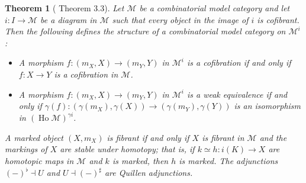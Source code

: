 \documentclass[a4paper]{article}
\newtheorem{theorem}{Theorem}
\theoremstyle{remark}
\theoremstyle{definition}
\begin{document}
\begin{theorem}[\citet{marked-objects} Theorem 3.3]
  \label{th:marked-model-category}
  Let $\mathcal{M}$ be a combinatorial model category and let $i : I \rightarrow \mathcal{M}$ be a diagram in $\mathcal{M}$ such that every object in the image of $i$ is cofibrant.
  Then the following defines the structure of a combinatorial model category on $\mathcal{M}^i$:
  \begin{itemize}
    \item
      A morphism $f : (m_X, X) \rightarrow (m_Y, Y)$ in $\mathcal{M}^i$ is a cofibration if and only if $f : X \rightarrow Y$ is a cofibration in $\mathcal{M}$.
    \item
      A morphism $f : (m_X, X) \rightarrow (m_Y, Y)$ in $\mathcal{M}^i$ is a weak equivalence if and only if $\gamma(f) : (\gamma(m_X), \gamma(X)) \rightarrow (\gamma(m_Y), \gamma(Y))$ is an isomorphism in $(\operatorname{Ho} \mathcal{M})^{\gamma i}$.
  \end{itemize}
  A marked object $(X, m_X)$ is fibrant if and only if $X$ is fibrant in $\mathcal{M}$ and the markings of $X$ are stable under homotopy; that is, if $k \simeq h : i(K) \rightarrow X$ are homotopic maps in $\mathcal{M}$ and $k$ is marked, then $h$ is marked.
  The adjunctions $(-)^\flat \dashv U$ and $U \dashv (-)^\sharp$ are Quillen adjunctions.
\end{theorem}
\end{document}
